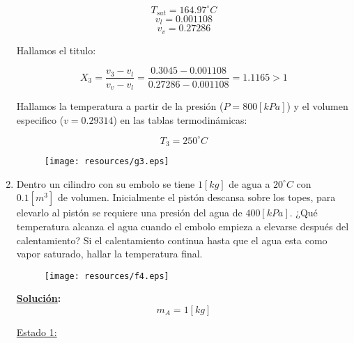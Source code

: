 \documentclass[letter,11pt]{article}
\begin{document}
\begin{enumerate}
\begin{equation*}
    T_{sat}=164.97^\circ C
\end{equation*}
\begin{equation*}
    v_l=0.001108
\end{equation*}
\begin{equation*}
    v_v=0.27286
\end{equation*}

Hallamos el titulo:

\begin{equation*}
    X_3=\frac{v_3-v_l}{v_v-v_l}=\frac{0.3045-0.001108}{0.27286-0.001108}=1.1165>1
\end{equation*}

Hallamos la temperatura a partir de la presión ($P=800[kPa]$) y el volumen especifico ($v=0.29314$) en las tablas termodinámicas:

\begin{equation*}
    T_3=250^\circ C
\end{equation*}

\begin{figure}[!h]
\centering
\texttt{[image: resources/g3.eps]}
\end{figure}
\vspace{1.0cm}

\newpage

\item Dentro un cilindro con su embolo se tiene $1[kg]$ de agua a $20^\circ C$
con $0.1[m^3]$ de volumen. Inicialmente el pistón descansa sobre los topes, para
elevarlo al pistón se requiere una presión del agua de $400[kPa]$. ¿Qué
temperatura alcanza el agua cuando el embolo empieza a elevarse después del
calentamiento? Si el calentamiento continua hasta que el agua esta como vapor
saturado, hallar la temperatura final.

\vspace{0.75cm}
\begin{figure}[!h]
\centering
\texttt{[image: resources/f4.eps]}
\end{figure}
\vspace{0.75cm}

\textbf{\underline{Solución}:} \\

\begin{equation*}
    m_A=1[kg]
\end{equation*}

\underline{Estado 1:} \\


\end{enumerate}
\end{document}
